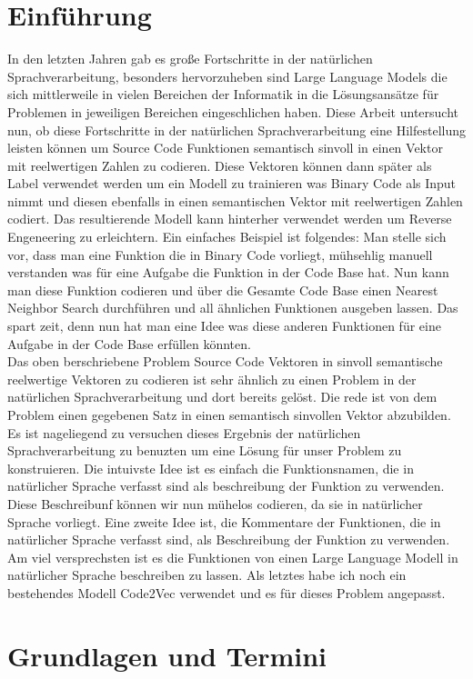 \documentclass[12pt,letterpaper,ngerman]{article}
\begin{document}
\section{Einführung}
In den letzten Jahren gab es große Fortschritte in der natürlichen
Sprachverarbeitung, besonders hervorzuheben sind Large Language Models
die sich mittlerweile in vielen Bereichen der Informatik in die Lösungsansätze
für Problemen in jeweiligen Bereichen eingeschlichen haben. Diese Arbeit
untersucht nun, ob diese Fortschritte in der natürlichen Sprachverarbeitung
eine Hilfestellung leisten können um Source Code Funktionen semantisch sinvoll
in einen Vektor mit reelwertigen Zahlen zu codieren. Diese Vektoren können dann
später als Label verwendet werden um ein Modell zu trainieren was Binary Code 
als Input nimmt und diesen ebenfalls in einen semantischen Vektor mit reelwertigen
Zahlen codiert. Das resultierende Modell kann hinterher verwendet werden um Reverse 
Engeneering zu erleichtern. Ein einfaches Beispiel ist folgendes: Man stelle
sich vor, dass man eine Funktion die in Binary Code vorliegt, mühsehlig manuell
verstanden was für eine Aufgabe die Funktion in der Code Base hat. Nun kann man
diese Funktion codieren und über die Gesamte Code Base einen Nearest Neighbor
Search durchführen und all ähnlichen Funktionen ausgeben lassen.
Das spart zeit, denn nun hat man eine Idee was diese anderen
Funktionen für eine Aufgabe in der Code Base erfüllen könnten.\\
Das oben berschriebene Problem Source Code Vektoren in sinvoll semantische 
reelwertige Vektoren zu codieren ist sehr ähnlich zu einen Problem 
in der natürlichen Sprachverarbeitung und dort bereits gelöst. Die rede ist
von dem Problem einen gegebenen Satz in einen semantisch sinvollen Vektor
abzubilden. Es ist nageliegend zu versuchen dieses Ergebnis der natürlichen
Sprachverarbeitung zu benuzten um eine Lösung für unser Problem zu konstruieren.
Die intuivste Idee ist es einfach die Funktionsnamen, die in natürlicher Sprache
verfasst sind als beschreibung der Funktion zu verwenden. Diese Beschreibunf können
wir nun mühelos codieren, da sie in natürlicher Sprache vorliegt.
Eine zweite Idee ist, die Kommentare der Funktionen, die in natürlicher Sprache
verfasst sind, als Beschreibung der Funktion zu verwenden. Am viel versprechsten
ist es die Funktionen von einen Large Language Modell in natürlicher Sprache
beschreiben zu lassen. Als letztes habe ich noch ein bestehendes Modell
Code2Vec verwendet und es für dieses Problem angepasst.
\pagebreak
\section{Grundlagen und Termini}
\end{document}
